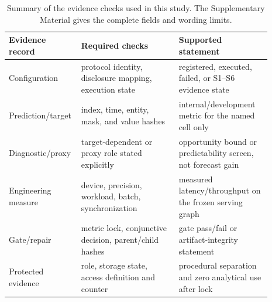 \begin{table}[t]
\centering
\caption{Summary of the evidence checks used in this study. The Supplementary Material gives the complete fields and wording limits.}
\label{tab:audit-framework-compact}
\footnotesize
\begin{tabular}{>{\raggedright\arraybackslash}p{0.19\linewidth}>{\raggedright\arraybackslash}p{0.36\linewidth}>{\raggedright\arraybackslash}p{0.34\linewidth}}
\toprule
Evidence record & Required checks & Supported statement \\
\midrule
Configuration & protocol identity, disclosure mapping, execution state & registered, executed, failed, or S1--S6 evidence state \\
Prediction/target & index, time, entity, mask, and value hashes & internal/development metric for the named cell only \\
Diagnostic/proxy & target-dependent or proxy role stated explicitly & opportunity bound or predictability screen, not forecast gain \\
Engineering measure & device, precision, workload, batch, synchronization & measured latency/throughput on the frozen serving graph \\
Gate/repair & metric lock, conjunctive decision, parent/child hashes & gate pass/fail or artifact-integrity statement \\
Protected evidence & role, storage state, access definition and counter & procedural separation and zero analytical use after lock \\
\bottomrule
\end{tabular}
\end{table}
